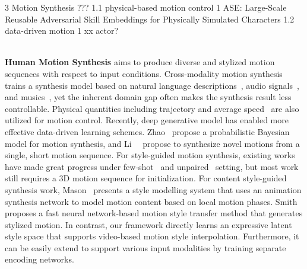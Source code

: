 
    3 Motion Synthesis ???
    1.1 physical-based motion control
    1 ASE: Large-Scale Reusable Adversarial Skill Embeddings for Physically Simulated Characters
    1.2 data-driven motion
    1 xx actor?


    \hspace*{\fill} \\{\bf Human Motion Synthesis} aims to produce diverse and stylized motion sequences with respect to input conditions. Cross-modality motion synthesis trains a synthesis model based on natural language descriptions~\cite{lin2018human, Text2Action}, audio signals~\cite{Ondras2021AudioDrivenRU}, and musics~\cite{lee2019dancing, Transflower, starke2022deepphase, li2021ai}, yet the inherent domain gap often makes the synthesis result less controllable. Physical quantities including trajectory and average speed~\cite{pavllo2018quaternet} are also utilized for motion control.
    Recently, deep generative model has enabled more effective data-driven learning schemes.
    Zhao~\etal\cite{zhao2020bayesian} propose a probabilistic Bayesian model for motion synthesis, and Li~\etal~\cite{li2022ganimator} propose to synthesize novel motions from a single, short motion sequence.
    For style-guided motion synthesis, existing works have made great progress under few-shot~\cite{Mason2018FewshotLO} and unpaired~\cite{Aberman2020UnpairedMS, Wang2021ACC} setting, but most work still requires a 3D motion sequence for initialization.
    For content style-guided synthesis work,
    Mason~\etal\cite{mason2022real} presents a style modelling system that uses an animation synthesis network to model motion content based on local motion phases.
    Smith~\etal\cite{smith2019efficient} proposes a fast neural network-based motion style transfer method that generates stylized motion.
    In contrast, our framework directly learns an expressive latent style space that supports video-based motion style interpolation. Furthermore, it can be easily extend to support various input modalities by training separate encoding networks.
\fi